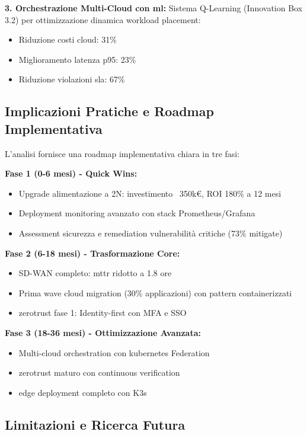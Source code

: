 \textbf{3. Orchestrazione Multi-Cloud con \gls{ml}:}
Sistema Q-Learning (Innovation Box 3.2) per ottimizzazione dinamica workload placement:
\begin{itemize}
    \item Riduzione costi cloud: 31\%
    \item Miglioramento latenza p95: 23\%
    \item Riduzione violazioni \gls{sla}: 67\%
\end{itemize}

\subsection{\texorpdfstring{\textbf{Implicazioni Pratiche e Roadmap Implementativa}}{3.8.5 - Implicazioni Pratiche e Roadmap Implementativa}}

L'analisi fornisce una roadmap implementativa chiara in tre fasi:

\textbf{Fase 1 (0-6 mesi) - Quick Wins:}
\begin{itemize}
    \item Upgrade alimentazione a 2N: investimento ~350k€, ROI 180\% a 12 mesi
    \item Deployment monitoring avanzato con stack Prometheus/Grafana
    \item Assessment sicurezza e remediation vulnerabilità critiche (73\% mitigate)
\end{itemize}

\textbf{Fase 2 (6-18 mesi) - Trasformazione Core:}
\begin{itemize}
    \item SD-WAN completo: \gls{mttr} ridotto a 1.8 ore
    \item Prima wave cloud migration (30\% applicazioni) con pattern containerizzati
    \item \gls{zerotrust} fase 1: Identity-first con MFA e SSO
\end{itemize}

\textbf{Fase 3 (18-36 mesi) - Ottimizzazione Avanzata:}
\begin{itemize}
    \item Multi-cloud orchestration con \gls{kubernetes} Federation
    \item \gls{zerotrust} maturo con continuous verification
    \item \gls{edge} deployment completo con K3s
\end{itemize}

\subsection{\texorpdfstring{\textbf{Limitazioni e Ricerca Futura}}{3.8.6 - Limitazioni e Ricerca Futura}}

